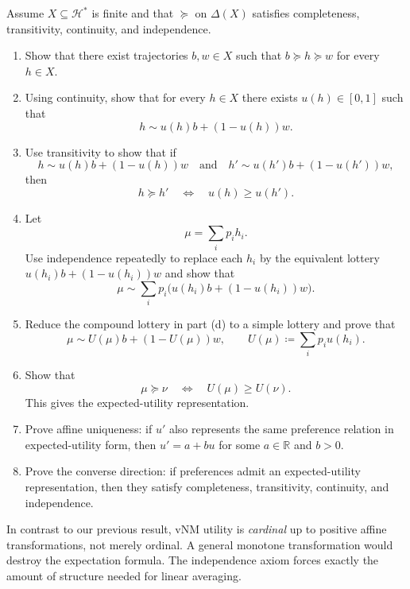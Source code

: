 \documentclass[11pt]{article}
\newcommand{\Hcal}{\mathcal{H}}
\newcommand{\R}{\mathbb{R}}
\newcommand{\pref}{\succcurlyeq}
\newcommand{\indiff}{\sim}
\newcommand{\Lot}{\Delta}
\begin{document}
\begin{exercise}
\label{ex:vnm-theorem}
Assume $X\subseteq \Hcal^*$ is finite and that $\pref$ on $\Lot(X)$ satisfies
completeness, transitivity, continuity, and independence.
\begin{enumerate}[label=(\alph*)]
\item Show that there exist trajectories $b,w\in X$ such that
$b\pref h \pref w$ for every $h\in X$.
\item Using continuity, show that for every $h\in X$ there exists
$u(h)\in[0,1]$ such that
\[
h \indiff u(h)b+(1-u(h))w.
\]
\item Use transitivity to show that if
\[
h \indiff u(h)b+(1-u(h))w
\quad\text{and}\quad
h' \indiff u(h')b+(1-u(h'))w,
\]
then
\[
h\pref h' \quad\Longleftrightarrow\quad u(h)\geq u(h').
\]
\item Let
\[
\mu=\sum_i p_i h_i.
\]
Use independence repeatedly to replace each $h_i$ by the equivalent lottery
$u(h_i)b+(1-u(h_i))w$ and show that
\[
\mu \indiff \sum_i p_i\bigl(u(h_i)b+(1-u(h_i))w\bigr).
\]
\item Reduce the compound lottery in part (d) to a simple lottery and prove
that
\[
\mu \indiff U(\mu)b+(1-U(\mu))w,
\qquad
U(\mu)\coloneqq \sum_i p_i u(h_i).
\]
\item Show that
\[
\mu\pref\nu \quad\Longleftrightarrow\quad U(\mu)\geq U(\nu).
\]
This gives the expected-utility representation.
\item Prove affine uniqueness: if $u'$ also represents the same preference
relation in expected-utility form, then $u'=a+bu$ for some $a\in\R$ and $b>0$.
\item Prove the converse direction: if preferences admit an expected-utility
representation, then they satisfy completeness, transitivity, continuity, and
independence.
\end{enumerate}
\end{exercise}


In contrast to our previous result, vNM utility is \emph{cardinal} up to
positive affine transformations, not merely ordinal. A general
monotone transformation would destroy the expectation formula. The independence
axiom forces exactly the amount of structure needed for linear averaging.
\end{document}
